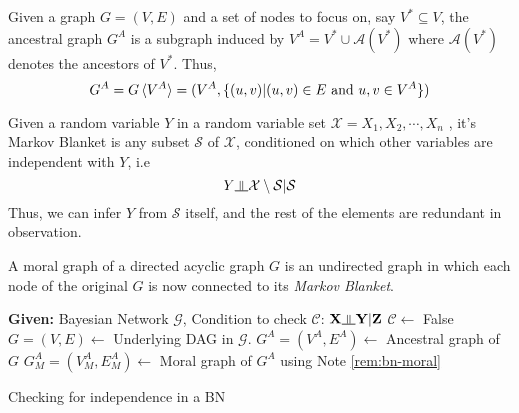 \begin{defn}
Given a graph $G = (V,E)$ and a set of nodes to focus on, say $V^* \subseteq V$, the ancestral graph ${G}^A$ is a subgraph induced by $V^A = V^* \cup \mathcal{A}(V^*)$ where $\mathcal{A}(V^*)$ denotes the ancestors of $V^*$. Thus,
\begin{equation}
G^A = G\braket{V^A} = (V^A, \{(u,v) | (u, v) \in E \text{ and } u, v \in V^A\})
\end{equation}
\begin{defn}
Given a random variable $Y$ in a random variable set $\mathcal X = {X_1, X_2, \cdots, X_n}$ , it's Markov Blanket is any subset $\mathcal S$ of $\mathcal X$, conditioned on which other variables are independent with $Y$, i.e
\begin{equation}
Y \ind \mathcal{X}\setminus\mathcal{S} | \mathcal S
\end{equation}
Thus, we can infer $Y$ from $\mathcal S$ itself, and the rest of the elements are redundant in observation.
\end{defn}
\end{defn}
\begin{defn}
A moral graph of a directed acyclic graph $G$ is an undirected graph in which each node of the original $G$ is now connected to its \textit{Markov Blanket}.
\end{defn}
\begin{algorithm}[H]\label{alg:bn-moral}
	\DontPrintSemicolon
	\textbf{Given:} Bayesian Network $\mathcal G$, Condition to check $\mathcal{C}$: $\mathbf X \ind \mathbf Y | \mathbf Z$ \;
	$\mathcal C \leftarrow$ False\;
	$G = (V,E) \leftarrow$ Underlying DAG in $\mathcal G$. \;
	$G^A = (V^A, E^A) \leftarrow$ Ancestral graph of $G$ \;
	$G^A_M = (V^A_M, E^A_M)\leftarrow$ Moral graph of $G^A$ using Note \ref{rem:bn-moral} \;
	\;
	\caption{Checking for independence in a BN}
\end{algorithm}
